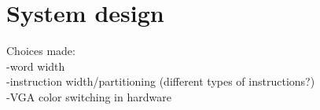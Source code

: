 \section {System design}

Choices made:\\
-word width\\
-instruction width/partitioning (different types of instructions?)\\
-VGA color switching in hardware\\
